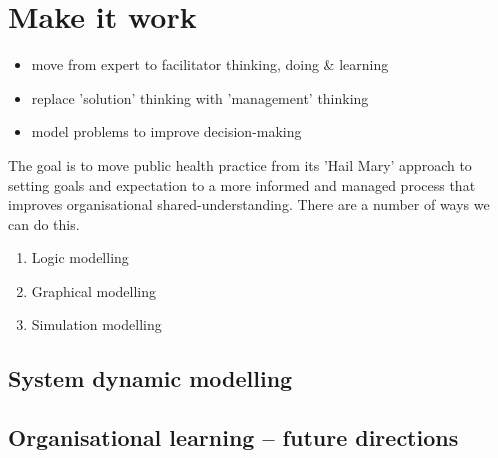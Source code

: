 \section{Make it work}
\begin{itemize}
	\item move from expert to facilitator thinking, doing \& learning
	\item replace 'solution' thinking with 'management' thinking
	\item model problems to improve decision-making
\end{itemize}

The goal is to move public health practice from its 'Hail Mary' approach to setting goals and expectation to a more informed and managed process that improves organisational shared-understanding. There are a number of ways we can do this.
\begin{enumerate}
	\item Logic modelling
	\item Graphical modelling
	\item Simulation modelling
\end{enumerate}

\subsection{System dynamic modelling}

\subsection{Organisational learning -- future directions}




